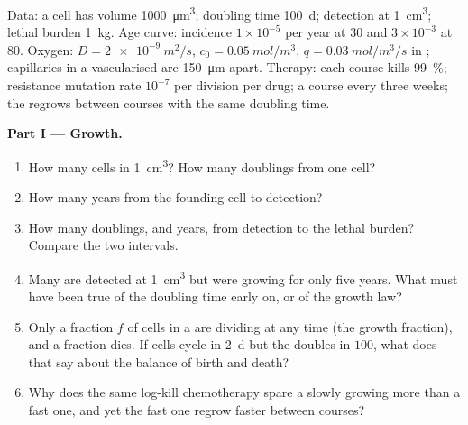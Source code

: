 \begin{problem}
\label{pb:b3:cancer-biology:1}
Data: a  cell has volume \qty{1000}{\micro m^3}; doubling time
\qty{100}{d}; detection at \qty{1}{cm^3}; lethal burden \qty{1}{kg}.
Age curve: incidence $1\times 10^{-5}$ per year at $30$ and $3\times
10^{-3}$ at $80$. Oxygen: $D = \qty{2e-9}{m^2/s}$, $c_{0} =
\qty{0.05}{mol/m^3}$, $q = \qty{0.03}{mol/m^3/s}$ in ; capillaries
in a vascularised  are \qty{150}{\micro m} apart. Therapy: each
course kills \qty{99}{\%}; resistance mutation rate $10^{-7}$ per
division per drug; a course every three weeks; the  regrows
between courses with the same doubling time.

\medskip
\noindent\textbf{Part I --- Growth.}
\begin{enumerate}
  \item How many cells in \qty{1}{cm^3}? How many doublings from one
        cell?
  \item How many years from the founding cell to detection?
  \item How many doublings, and years, from detection to the lethal
        burden? Compare the two intervals.
  \item Many  are detected at \qty{1}{cm^3} but were growing for
        only five years. What must have been true of the doubling time
        early on, or of the growth law?
  \item Only a fraction $f$ of cells in a  are dividing at any
        time (the growth fraction), and a fraction dies. If cells cycle
        in \qty{2}{d} but the  doubles in $100$, what does
        that say about the balance of birth and death?
  \item Why does the same log-kill chemotherapy spare a slowly
        growing  more than a fast one, and yet the fast one
        regrow faster between courses?
\end{enumerate}


\end{problem}

